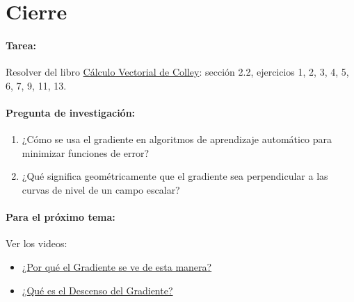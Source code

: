 \documentclass[a4,11pt]{aleph-notas}
\begin{document}
\section*{Cierre}

\paragraph{Tarea:}
Resolver del libro \href{https://catalogobiblioteca.puce.edu.ec/cgi-bin/koha/opac-detail.pl?biblionumber=83405&query_desc=su%3A%22An%C3%A1lisis%20vectorial%22}{Cálculo Vectorial de Colley}: sección 2.2, ejercicios 1, 2, 3, 4, 5, 6, 7, 9, 11, 13.

\paragraph{Pregunta de investigación:}
\begin{enumerate}[leftmargin=*]
    \item ¿Cómo se usa el gradiente en algoritmos de aprendizaje automático para minimizar funciones de error?
    \item ¿Qué significa geométricamente que el gradiente sea perpendicular a las curvas de nivel de un campo escalar?
\end{enumerate}

\paragraph{Para el próximo tema:}
Ver los videos:
\begin{itemize}[leftmargin=*]
    \item \href{https://youtu.be/Ag9GBB3pPkU?si=TgUNvD-IEr8Opy6x}{¿Por qué el Gradiente se ve de esta manera?}
    \item \href{https://youtu.be/A6FiCDoz8_4?si=J93rcxDWUy4mN7G0}{¿Qué es el Descenso del Gradiente?}
\end{itemize}
\end{document}
